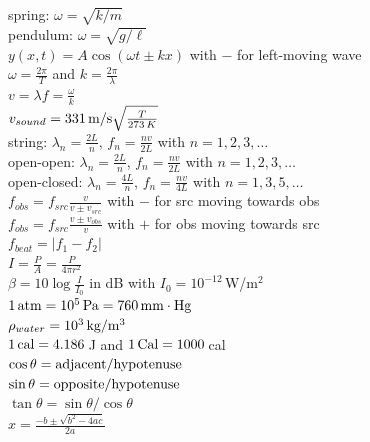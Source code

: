 \documentclass[letterpaper,addpoints,answers]{exam}
\begin{document}
\begin{multicols}{2}
 spring: $\omega = \sqrt{k/m}$ \\
 pendulum: $\omega = \sqrt{g/\ell}$ \\
 $y(x,t) = A \cos (\omega t \pm k x)$ with $-$ for left-moving wave \\
 $\omega = \frac{2 \pi}{T}$ and $k = \frac{2 \pi}{\lambda}$ \\
 $v = \lambda f = \frac{\omega}{k}$ \\
 $v_{sound} = 331\,\hbox{m/s} \sqrt{\frac{T}{273\,K}}$ \\
 string: $\lambda_n = \frac{2 L}{n}$, $f_n = \frac{n v}{2 L}$ with $n = 1,2,3,\ldots$ \\
 open-open: $\lambda_n = \frac{2 L}{n}$, $f_n = \frac{n v}{2 L}$ with $n = 1,2,3,\ldots$ \\
 open-closed: $\lambda_n = \frac{4 L}{n}$, $f_n = \frac{n v}{4 L}$ with $n = 1,3,5,\ldots$ \\
 $f_{obs} = f_{src} \frac{v}{v \pm v_{src}}$ with $-$ for src moving towards obs \\
 $f_{obs} = f_{src} \frac{v \pm v_{obs}}{v}$ with $+$ for obs moving towards src \\
 $f_{beat} = |f_1 - f_2|$ \\
 $I = \frac{P}{A} = \frac{P}{4 \pi r^2}$ \\
 $\beta = 10 \log \frac{I}{I_0}$ in dB with $I_0 = 10^{-12}$\,W/m$^2$\\
 $1\,\hbox{atm} = 10^5\,\hbox{Pa} = 760\,\hbox{mm}\cdot\hbox{Hg}$ \\
 $\rho_{water} = 10^3\,\hbox{kg}/\hbox{m}^3$ \\
 $1\,\hbox{cal} = 4.186$\,J and $1\,\hbox{Cal} = 1000$\,cal \\ 
 $\cos\theta = \hbox{adjacent}/\hbox{hypotenuse}$ \\
 $\sin\theta = \hbox{opposite}/\hbox{hypotenuse}$ \\
 $\tan\theta = \sin\theta / \cos\theta$ \\
 $x = \frac{-b \pm \sqrt{b^2 - 4 a c}}{2 a}$ \\

 \end{multicols}
\end{document}
